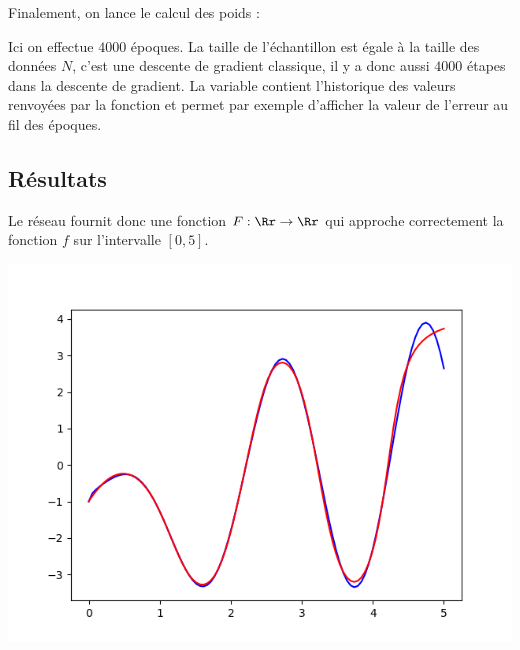 \documentclass[11pt,class=report,crop=false]{standalone}
\begin{document}
Finalement, on lance le calcul des poids : 

Ici on effectue $4000$ époques. La taille de l'échantillon est égale à la taille des données $N$, c'est une descente de gradient classique, il y a donc aussi $4000$ étapes dans la descente de gradient.
La variable  contient l'historique des valeurs renvoyées par la fonction  et permet par exemple d'afficher la valeur de l'erreur au fil des époques.



\subsection{Résultats}

Le réseau fournit donc une fonction $F : \Rr \to \Rr$ qui approche correctement la fonction $f$ sur l'intervalle $[0,5]$.
\begin{center}
\includegraphics[scale=\myscale,scale=0.5]{figures/unevar-fonction-approx}
\end{center}
\end{document}
